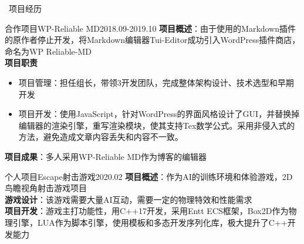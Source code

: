 \documentclass[UTF8]{resume}
\begin{document}
\begin{rSection}{\faUsers~项目经历}

    \begin{rProject}{合作项目}{WP-Reliable MD}{2018.09-2019.10}
        \textbf{项目概述}：由于使用的Markdown插件的原作者停止开发，将Markdown编辑器Tui-Editor成功引入WordPress插件商店，命名为WP Reliable-MD\\
        \textbf{项目职责}
        \begin{itemize}
            \itemsep -0.5em \vspace{-0.5em}
            \item 项目管理：担任组长，带领3开发团队，完成整体架构设计、技术选型和早期开发
            \item 项目开发：使用JavaScript，针对WordPress的界面风格设计了GUI，并替换掉编辑器的渲染引擎，重写渲染模块，使其支持Tex数学公式。采用非侵入式的方法，避免造成文章内容丢失和内容不一致。
        \end{itemize}
        \textbf{项目成果}：多人采用WP-Reliable MD作为博客的编辑器
    \end{rProject}

    \begin{rProject}{个人项目}{Escape射击游戏}{2020.02}
        \textbf{项目概述}：作为AI的训练环境和体验游戏，2D鸟瞻视角射击游戏项目\\
        \textbf{游戏设计}：该游戏需要大量AI互动，需要一定的物理特效和性能需求\\
        \textbf{项目开发}：游戏主打功能性，用C++17开发，采用Entt ECS框架，Box2D作为物理引擎，LUA作为脚本引擎，使用模板和多态开发序列化库，极大提升了C++开发能力
    \end{rProject}



\end{rSection}
\end{document}
